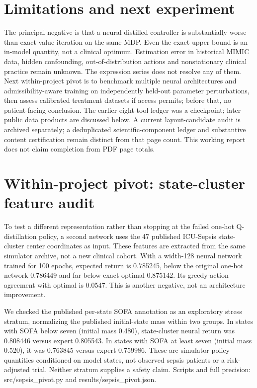 \section{Limitations and next experiment}
The principal negative is that a neural distilled controller is substantially worse than exact value iteration on the same MDP. Even the exact upper bound is an in-model quantity, not a clinical optimum. Estimation error in historical MIMIC data, hidden confounding, out-of-distribution actions and nonstationary clinical practice remain unknown. The expression series does not resolve any of them. Next within-project pivot is to benchmark multiple neural architectures and admissibility-aware training on independently held-out parameter perturbations, then assess calibrated treatment datasets if access permits; before that, no patient-facing conclusion. The earlier eight-tool ledger was a checkpoint; later public data products are discussed below. A current layout-candidate audit is archived separately; a deduplicated scientific-component ledger and substantive content certification remain distinct from that page count. This working report does not claim completion from PDF page totals.
\section{Within-project pivot: state-cluster feature audit}
To test a different representation rather than stopping at the failed one-hot Q-distillation policy, a second network uses the 47 published ICU-Sepsis state-cluster center coordinates as input. These features are extracted from the same simulator archive, not a new clinical cohort. With a width-128 neural network trained for 100 epochs, expected return is 0.785245, below the original one-hot network 0.786449 and far below exact optimal 0.875142. Its greedy-action agreement with optimal is 0.0547. This is another negative, not an architecture improvement.

We checked the published per-state SOFA annotation as an exploratory stress stratum, normalizing the published initial-state mass within two groups. In states with SOFA below seven (initial mass 0.480), state-cluster neural return was 0.808446 versus expert 0.805543. In states with SOFA at least seven (initial mass 0.520), it was 0.763845 versus expert 0.759986. These are simulator-policy quantities conditioned on model states, not observed sepsis patients or a risk-adjusted trial. Neither stratum supplies a safety claim. Scripts and full precision: src/sepsis\_pivot.py and results/sepsis\_pivot.json.

